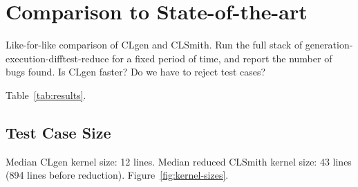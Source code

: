 \section{Comparison to State-of-the-art}

Like-for-like comparison of CLgen and CLSmith. Run the full stack of generation-execution-difftest-reduce for a fixed period of time, and report the number of bugs found. Is CLgen faster? Do we have to reject test cases?

Table~\ref{tab:results}.



\subsection{Test Case Size}

Median CLgen kernel size: 12 lines. Median reduced CLSmith kernel size: 43 lines (894 lines before reduction). Figure~\ref{fig:kernel-sizes}.